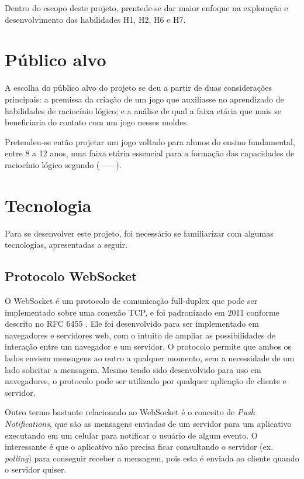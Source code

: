 Dentro do escopo deste projeto, prentede-se dar maior enfoque na exploração e
desenvolvimento das habilidades H1, H2, H6 e H7.


\section{Público alvo}\label{sec-publico-alvo}

A escolha do público alvo do projeto se deu a partir de duas considerações
principais: a premissa da criação de um jogo que auxiliasse no aprendizado 
de habilidades de raciocínio lógico; e a análise de qual a faixa etária que 
mais se beneficiaria do contato com um jogo nesses moldes.

Pretendeu-se então projetar um jogo voltado para alunos do ensino fundamental, 
entre 8 a 12 anos, uma faixa etária essencial para a formação das capacidades 
de raciocínio lógico segundo (------).


\section{Tecnologia}\label{sec-tecnologia}

Para se desenvolver este projeto, foi necessário se familiarizar com algumas tecnologias, apresentadas a seguir. 
\subsection{Protocolo WebSocket}\label{subsec-teo-websocket}

O WebSocket é um protocolo de comunicação full-duplex que pode ser implementado
sobre uma conexão TCP, e foi padronizado em 2011 conforme descrito no RFC 6455
\cite{RFC:2011:websocket}. Ele foi desenvolvido para ser implementado em 
navegadores e servidores web, com o intuito de ampliar as possibilidades de
interação entre um navegador e um servidor. O protocolo permite que ambos os 
lados enviem mensagens ao outro a qualquer momento, sem a necessidade de um 
lado solicitar a mensagem. Mesmo tendo sido desenvolvido para uso em navegadores, 
o protocolo pode ser utilizado por qualquer aplicação de cliente e servidor.

Outro termo bastante relacionado ao WebSocket é o conceito de 
\textit{Push Notifications}, que são as mensagens enviadas de um servidor para 
um aplicativo executando em um celular para notificar o usuário de algum evento. 
O interessante é que o aplicativo não precisa ficar consultando o servidor 
(ex. \textit{polling}) para conseguir receber a mensagem, pois esta é enviada 
ao cliente quando o servidor quiser.

